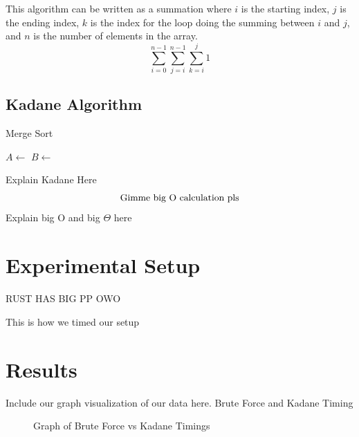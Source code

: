 \documentclass[10pt, letterpaper]{article}
\begin{document}
	This algorithm can be written as a summation where $i$ is the starting index, $j$ is the ending index, $k$ is the index for the loop doing the summing between $i$ and $j$, and $n$ is the number of elements in the array.
	\[\sum_{i = 0}^{n-1}\sum_{j = i}^{n-1}\sum_{k = i}^{j}1\]
	
	\subsection{Kadane Algorithm}

  \begin{algorithm}
		\caption{Merge Sort}\label{mergesort}
	\begin{algorithmic}
	\EndIf
	\State $A\gets$
	\State $B\gets$\\
	\EndFunction
	\end{algorithmic}
	\end{algorithm}

  Explain Kadane Here
  \[
	\textnormal{Gimme big O calculation pls}
	\]
	Explain big O and big $\Theta$ here
	\section{Experimental Setup}
	RUST HAS BIG PP OWO

	This is how we timed our setup
	\section{Results}
	Include our graph visualization of our data here. Brute Force and Kadane Timing
	

	\begin{figure}[!htb]
	\caption{
		\label{fig:time-graph} Graph of Brute Force vs Kadane Timings
	}
	\end{figure}
\end{document}
